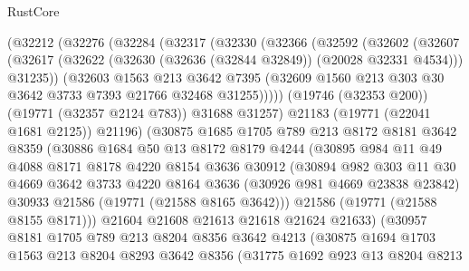 \begin{lexlean}{RustCore}
\begin{coremodule}
      (@32212
        (@32276
          (@32284
            (@32317
              (@32330
                (@32366
                  (@32592
                    (@32602
                      (@32607
                        (@32617
                          (@32622 (@32630 (@32636 (@32844 @32849)) (@20028 @32331 @4534)))
                          @31235))
                      (@32603
                        @1563
                        @213
                        @3642
                        @7395
                        (@32609 @1560 @213 @303 @30 @3642 @3733 @7393 @21766 @32468 @31255)))))
                (@19746 (@32353 @200))
                (@19771 (@32357 @2124 @783))
                @31688
                @31257)
              @21183
              (@19771 (@22041 @1681 @2125))
              @21196)
            (@30875
              @1685
              @1705
              @789
              @213
              @8172
              @8181
              @3642
              @8359
              (@30886
                @1684
                @50
                @13
                @8172
                @8179
                @4244
                (@30895
                  @984
                  @11
                  @49
                  @4088
                  @8171
                  @8178
                  @4220
                  @8154
                  @3636
                  @30912
                  (@30894
                    @982
                    @303
                    @11
                    @30
                    @4669
                    @3642
                    @3733
                    @4220
                    @8164
                    @3636
                    (@30926 @981 @4669 @23838 @23842)
                    @30933
                    @21586
                    (@19771 (@21588 @8165 @3642)))
                  @21586
                  (@19771 (@21588 @8155 @8171)))
                @21604
                @21608
                @21613
                @21618
                @21624
                @21633)
              (@30957
                @8181
                @1705
                @789
                @213
                @8204
                @8356
                @3642
                @4213
                (@30875
                  @1694
                  @1703
                  @1563
                  @213
                  @8204
                  @8293
                  @3642
                  @8356
                  (@31775
                    @1692
                    @923
                    @13
                    @8204
                    @8213

\end{coremodule}
\end{lexlean}
